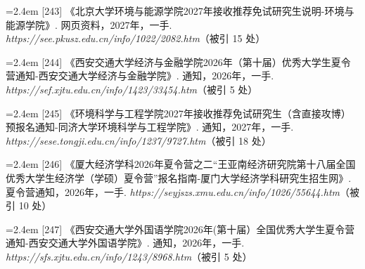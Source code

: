 {\vspace{0.6pt}
\vspace{3.5pt}\par
\nopagebreak\vspace{1pt}
\noindent\hangindent=2.4em \label{src:S0310}{\color{cAccent}[243]} 《北京大学环境与能源学院2027年接收推荐免试研究生说明-环境与能源学院》. 网页资料，2027年，一手. \textit{https://see.pkusz.edu.cn/info/1022/2082.htm}（被引 15 处）\par
\vspace{0.6pt}
\vspace{3.5pt}\par
\nopagebreak\vspace{1pt}
\noindent\hangindent=2.4em \label{src:S0312}{\color{cAccent}[244]} 《西安交通大学经济与金融学院2026年（第十届）优秀大学生夏令营通知-西安交通大学经济与金融学院》. 通知，2026年，一手. \textit{https://sef.xjtu.edu.cn/info/1423/33454.htm}（被引 5 处）\par
\vspace{0.6pt}
\vspace{3.5pt}\par
\nopagebreak\vspace{1pt}
\noindent\hangindent=2.4em \label{src:S0313}{\color{cAccent}[245]} 《环境科学与工程学院2027年接收推荐免试研究生（含直接攻博）预报名通知-同济大学环境科学与工程学院》. 通知，2027年，一手. \textit{https://sese.tongji.edu.cn/info/1237/9727.htm}（被引 18 处）\par
\vspace{0.6pt}
\vspace{3.5pt}\par
\nopagebreak\vspace{1pt}
\noindent\hangindent=2.4em \label{src:S0314}{\color{cAccent}[246]} 《厦大经济学科2026年夏令营之二“王亚南经济研究院第十八届全国优秀大学生经济学（学硕）夏令营”报名指南-厦门大学经济学科研究生招生网》. 夏令营通知，2026年，一手. \textit{https://seyjszs.xmu.edu.cn/info/1026/55644.htm}（被引 10 处）\par
\vspace{0.6pt}
\vspace{3.5pt}\par
\nopagebreak\vspace{1pt}
\noindent\hangindent=2.4em \label{src:S0317}{\color{cAccent}[247]} 《西安交通大学外国语学院2026年(第十届）全国优秀大学生夏令营通知-西安交通大学外国语学院》. 通知，2026年，一手. \textit{https://sfs.xjtu.edu.cn/info/1243/8968.htm}（被引 5 处）\par
}
